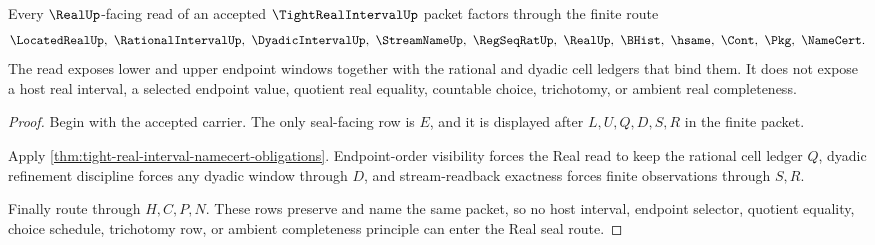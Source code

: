 \begin{theorem}
\label{thm:tight-real-interval-real-seal-route}
Every $\RealUp$-facing read of an accepted $\TightRealIntervalUp$ packet factors through the finite route
$$
\LocatedRealUp,\ \RationalIntervalUp,\ \DyadicIntervalUp,\ \StreamNameUp,\ \RegSeqRatUp,\ \RealUp,\ \BHist,\ \hsame,\ \Cont,\ \Pkg,\ \NameCert .
$$
The read exposes lower and upper endpoint windows together with the rational and dyadic cell ledgers that bind them. It does not expose a host real interval, a selected endpoint value, quotient real equality, countable choice, trichotomy, or ambient real completeness.
\end{theorem}
\begin{proof}
Begin with the accepted carrier. The only seal-facing row is $E$, and it is displayed after $L,U,Q,D,S,R$ in the finite packet.

Apply \autoref{thm:tight-real-interval-namecert-obligations}. Endpoint-order visibility forces the Real read to keep the rational cell ledger $Q$, dyadic refinement discipline forces any dyadic window through $D$, and stream-readback exactness forces finite observations through $S,R$.

Finally route through $H,C,P,N$. These rows preserve and name the same packet, so no host interval, endpoint selector, quotient equality, choice schedule, trichotomy row, or ambient completeness principle can enter the Real seal route.
\end{proof}

\begin{closurestatus}{\TightRealIntervalUp}
  \theoryclosure{\seedClosure}
  \formalstatus{\unformalizedV}
\end{closurestatus}
